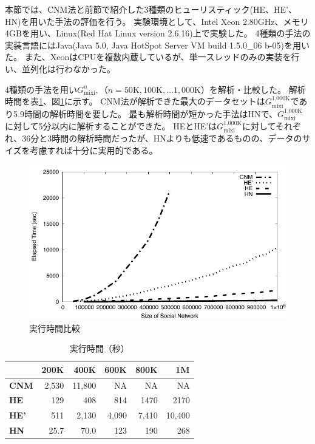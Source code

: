 \documentclass [a4j,11pt] {jsarticle}
\begin{document}
本節では、CNM法と前節で紹介した3種類のヒューリスティック(HE、HE'、HN)を用いた手法の評価を行う。
実験環境として、Intel Xeon 2.80GHz、メモリ4GBを用い、Linux(Red Hat Linux version 2.6.16)上で実験した。
4種類の手法の実装言語にはJava(Java 5.0, Java HotSpot Server VM build 1.5.0\_06 b-05)を用いた。
また、XeonはCPUを複数内蔵しているが、単一スレッドのみの実装を行い、並列化は行わなかった。

4種類の手法を用い$G_{\text {mixi}}^n,（n = 50\text{K}, 100\text{K}, \ldots 1,000\text{K}）$を解析・比較した。 
解析時間を表\ref{tbl: elapsed time}、図\ref{fig: compete time}に示す。
CNM法が解析できた最大のデータセットは$G_{\text{mixi}}^{\text{1,000K}}$であり5.9時間の解析時間を要した。
最も解析時間が短かった手法はHNで、$G_{\text{mixi}}^{\text{1,000K}}$に対して5分以内に解析することができた。
HEとHE'は$G_{\text{mixi}}^{\text{1,000K}}$に対してそれぞれ、36分と3時間の解析時間だったが、HNよりも低速であるものの、データのサイズを考慮すれば十分に実用的である。

\begin {figure}[htbp]
  \centerline {\includegraphics [width=0.80\linewidth]{fig5-all-etime-size.pdf}}
  \caption {実行時間比較}
  \label {fig: compete time}
\end{figure}

\begin {table}
  \caption {実行時間（秒）}
  \label {tbl: elapsed time}
  \begin {center}
    \begin {tabular}{lrrrrr} \\ \hline
          & 200K & 400K & 600K & 800K & 1M \\ \hline
      \textbf {CNM}& 2,530 & 11,800 & NA & NA & NA \\
      \textbf {HE}  & 129  & 408  & 814  & 1470 & 2170 \\
      \textbf {HE'} & 511  & 2,130 & 4,090 & 7,410 & 10,400 \\
      \textbf {HN}  & 25.7 & 70.0 & 123  & 190  & 268 \\
      \hline
    \end {tabular}
  \end {center}
\end {table}
\end{document}
